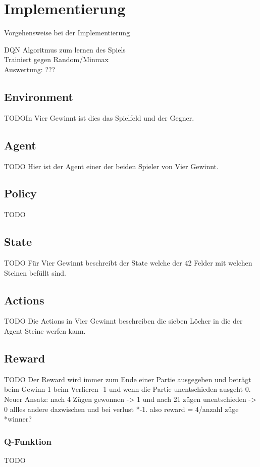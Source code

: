 \chapter{Implementierung}%

\label{cha:Implementierung}

Vorgehensweise bei der Implementierung

\colorbox{red!30}{DQN Algoritmus zum lernen des Spiels}\\
\colorbox{red!30}{Trainiert gegen Random/Minmax}\\
\colorbox{red!30}{Auswertung: ???}\\


\section{Environment}
\colorbox{red!30}{TODO}In Vier Gewinnt ist dies das Spielfeld und der Gegner. 

\section{Agent}
\colorbox{red!30}{TODO} Hier ist der Agent einer der beiden Spieler von Vier Gewinnt.

\section{Policy}
\colorbox{red!30}{TODO}

\section{State}
\colorbox{red!30}{TODO} Für Vier Gewinnt beschreibt der State welche der 42 Felder mit welchen Steinen befüllt sind. 

\section{Actions}
\colorbox{red!30}{TODO} Die Actions in Vier Gewinnt beschreiben die sieben Löcher in die der Agent Steine werfen kann.

\section{Reward}
\colorbox{red!30}{TODO} Der Reward wird immer zum Ende einer Partie ausgegeben und beträgt beim Gewinn 1 beim Verlieren -1 und wenn die Partie unentschieden ausgeht 0. Neuer Ansatz:
nach 4 Zügen gewonnen -> 1 und nach 21 zügen unentschieden -> 0  allles andere dazwischen und bei verlust *-1. also reward = 4/anzahl züge *winner?

\subsection{Q-Funktion}
\colorbox{red!30}{TODO} %
